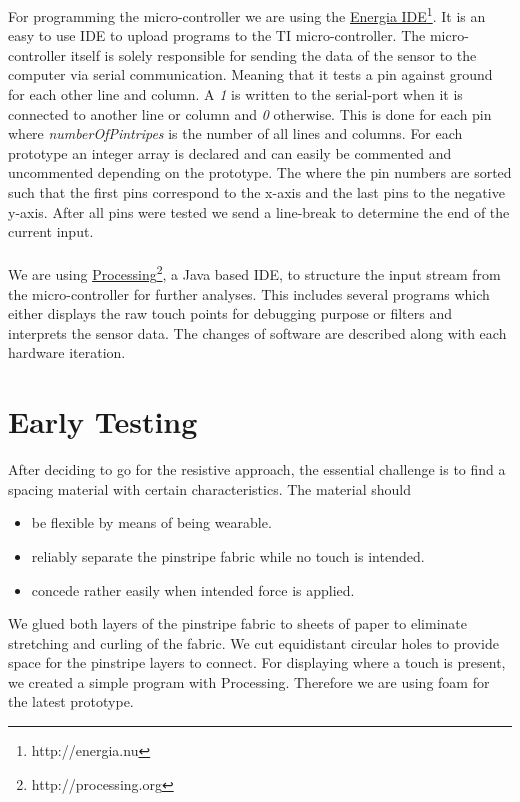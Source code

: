 For programming the micro-controller we are using the \href{http://energia.nu}{Energia IDE}\footnote{http://energia.nu}. It is an easy to use IDE to upload programs to the TI micro-controller. The micro-controller itself is solely responsible for sending the data of the sensor to the computer via serial communication. Meaning that it tests a pin against ground for each other line and column. A \emph{1} is written to the serial-port when it is connected to another line or column and \emph{0} otherwise. This is done for each pin where \emph{numberOfPintripes} is the number of all lines and columns. For each prototype an integer array is declared and can easily be commented and uncommented depending on the prototype. The where the pin numbers are sorted such that the first pins correspond to the x-axis and the last pins to the negative y-axis. After all pins were tested we send a line-break to determine the end of the current input.\\  \\

We are using \href{http://processing.org}{Processing}\footnote{http://processing.org}, a Java based IDE, to structure the input stream from the micro-controller for further analyses. This includes several programs which either displays the raw touch points for debugging purpose or filters and interprets the sensor data. The changes of software are described along with each hardware iteration. 

\section{Early Testing}
After deciding to go for the resistive approach, the essential challenge is to find a spacing material with certain characteristics. The material should
\begin{itemize}
\item be flexible by means of being wearable.
\item reliably separate the pinstripe fabric while no touch is intended.
\item concede rather easily when intended force is applied.
\end{itemize}
We glued both layers of the pinstripe fabric to sheets of paper to eliminate stretching and curling of the fabric. We cut equidistant circular holes to provide space for the pinstripe layers to connect. For displaying where a touch is present, we created a simple program with Processing.
Therefore we are using foam for the latest prototype. 

